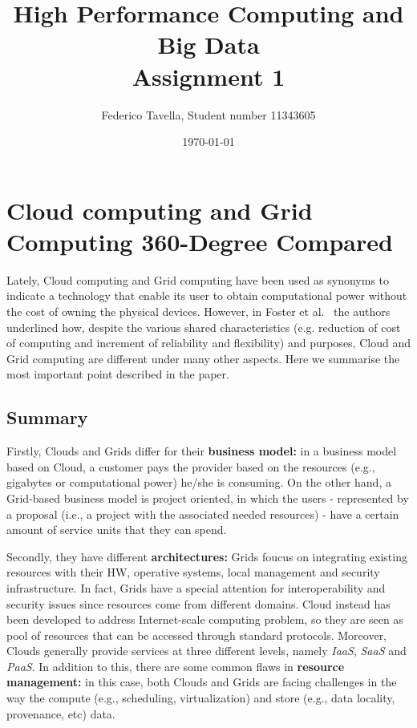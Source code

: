 \documentclass[a4paper]{IEEEtran}
\title{High Performance Computing and Big Data \\ Assignment 1}
\author{Federico Tavella, Student number 11343605}
\date{\today}
\begin{document}
\maketitle

\section{Cloud computing and Grid Computing 360-Degree Compared}

Lately, Cloud computing and Grid computing have been used as synonyms to indicate a technology that enable its user to obtain computational power without the cost of owning the physical devices. However, in Foster et al.~\cite{CloudGrid} the authors underlined how, despite the various shared characteristics (e.g. reduction of cost of computing and increment of reliability and flexibility) and purposes, Cloud and Grid computing are different under many other aspects. Here we summarise the most important point described in the paper. 

\subsection{Summary}

Firstly, Clouds and Grids differ for their \textbf{business model:} in a business model based on Cloud, a customer pays the provider based on the resources (e.g., gigabytes or computational power) he/she is consuming. On the other hand, a Grid-based business model is project oriented, in which the users - represented by a proposal (i.e., a project with the associated needed resources) - have a certain amount of service units that they can spend.

Secondly, they have different \textbf{architectures:} Grids foucus on integrating existing resources with their HW, operative systems, local management and security infrastructure. In fact, Grids have a special attention for interoperability and security issues since resources come from different domains. Cloud instead has been developed to address Internet-scale computing problem, so they are seen as pool of resources that can be accessed through standard protocols. Moreover, Clouds generally provide services at three different levels, namely \textit{IaaS}, \textit{SaaS} and \textit{PaaS}.
In addition to this, there are some common flaws in \textbf{resource management:} in this case, both Clouds and Grids are facing challenges in the way the compute (e.g., scheduling, virtualization) and store (e.g., data locality, provenance, etc) data.
\end{document}
